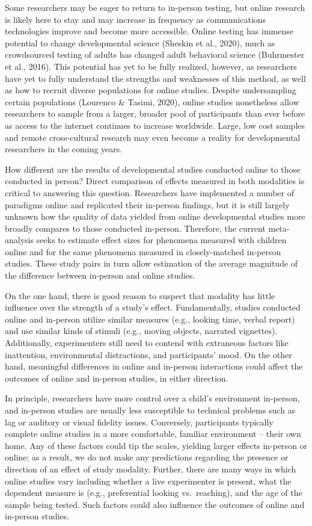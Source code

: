 \documentclass[
  man,floatsintext]{apa6}
\begin{document}
Some researchers may be eager to return to in-person testing, but online research is likely here to stay and may increase in frequency as communications technologies improve and become more accessible. Online testing has immense potential to change developmental science (Sheskin et al., 2020), much as crowdsourced testing of adults has changed adult behavioral science (Buhrmester et al., 2016). This potential has yet to be fully realized, however, as researchers have yet to fully understand the strengths and weaknesses of this method, as well as how to recruit diverse populations for online studies. Despite undersampling certain populations (Lourenco \& Tasimi, 2020), online studies nonetheless allow researchers to sample from a larger, broader pool of participants than ever before as access to the internet continues to increase worldwide. Large, low cost samples and remote cross-cultural research may even become a reality for developmental researchers in the coming years.

How different are the results of developmental studies conducted online to those conducted in person? Direct comparison of effects measured in both modalities is critical to answering this question. Researchers have implemented a number of paradigms online and replicated their in-person findings, but it is still largely unknown how the quality of data yielded from online developmental studies more broadly compares to those conducted in-person. Therefore, the current meta-analysis seeks to estimate effect sizes for phenomena measured with children online and for the same phenomena measured in closely-matched in-person studies. These study pairs in turn allow estimation of the average magnitude of the difference between in-person and online studies.

On the one hand, there is good reason to suspect that modality has little influence over the strength of a study's effect. Fundamentally, studies conducted online and in-person utilize similar measures (e.g., looking time, verbal report) and use similar kinds of stimuli (e.g., moving objects, narrated vignettes). Additionally, experimenters still need to contend with extraneous factors like inattention, environmental distractions, and participants' mood. On the other hand, meaningful differences in online and in-person interactions could affect the outcomes of online and in-person studies, in either direction.

In principle, researchers have more control over a child's environment in-person, and in-person studies are usually less susceptible to technical problems such as lag or auditory or visual fidelity issues. Conversely, participants typically complete online studies in a more comfortable, familiar environment -- their own home. Any of these factors could tip the scales, yielding larger effects in-person or online; as a result, we do not make any predictions regarding the presence or direction of an effect of study modality. Further, there are many ways in which online studies vary including whether a live experimenter is present, what the dependent measure is (e.g., preferential looking vs.~reaching), and the age of the sample being tested. Such factors could also influence the outcomes of online and in-person studies.
\end{document}
